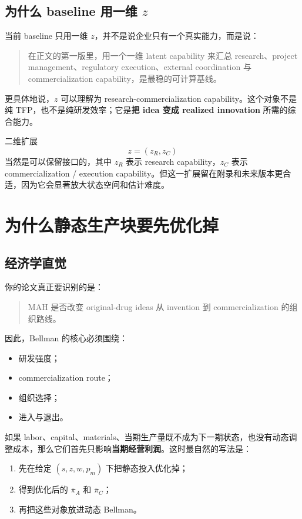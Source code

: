 \documentclass[12pt]{ctexart}
\begin{document}
\subsection{为什么 baseline 用一维 $z$}

当前 baseline 只用一维 $z$，并不是说企业只有一个真实能力，而是说：
\begin{quote}
在正文的第一版里，用一个一维 latent capability 来汇总 research、project management、regulatory execution、external coordination 与 commercialization capability，是最稳的可计算基线。
\end{quote}

更具体地说，$z$ 可以理解为 research-commercialization capability。这个对象不是纯 TFP，也不是纯研发效率；它是\textbf{把 idea 变成 realized innovation} 所需的综合能力。

二维扩展
\[
z=(z_R,z_C)
\]
当然是可以保留接口的，其中 $z_R$ 表示 research capability，$z_C$ 表示 commercialization / execution capability。但这一扩展留在附录和未来版本更合适，因为它会显著放大状态空间和估计难度。

\section{为什么静态生产块要先优化掉}

\subsection{经济学直觉}

你的论文真正要识别的是：
\begin{quote}
MAH 是否改变 original-drug ideas 从 invention 到 commercialization 的组织路线。
\end{quote}

因此，Bellman 的核心必须围绕：
\begin{itemize}
    \item 研发强度；
    \item commercialization route；
    \item 组织选择；
    \item 进入与退出。
\end{itemize}

如果 labor、capital、materials、当期生产量既不成为下一期状态，也没有动态调整成本，那么它们首先只影响\textbf{当期经营利润}。这时最自然的写法是：
\begin{enumerate}
    \item 先在给定 $(s,z,w,p_m)$ 下把静态投入优化掉；
    \item 得到优化后的 $\bar\pi_A$ 和 $\bar\pi_C$；
    \item 再把这些对象放进动态 Bellman。
\end{enumerate}
\end{document}
